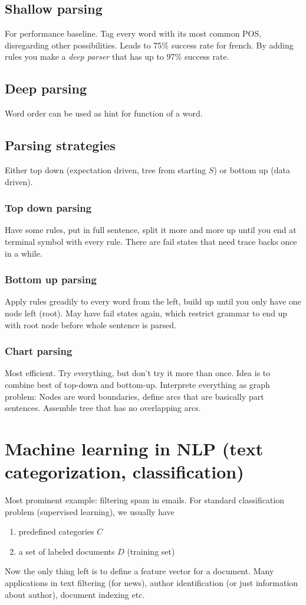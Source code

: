 \documentclass[11pt]{article}
\begin{document}
\subsection{Shallow parsing}
For performance baseline. Tag every word with its most common POS, disregarding other
possibilities. Leads to 75\% success rate for french. By adding rules you make
a \emph{deep parser} that has up to 97\% success rate.

\subsection{Deep parsing}
Word order can be used as hint for function of a word.

\subsection{Parsing strategies}
Either top down (expectation driven, tree from starting $S$) or bottom up (data driven).

\subsubsection{Top down parsing}
Have some rules, put in full sentence, split it more and more up until you end at
terminal symbol with every rule. There are fail states that need trace backs once in a while.

\subsubsection{Bottom up parsing}
Apply rules greadily to every word from the left, build up until you only have one node
left (root). May have fail states again, which restrict grammar to end up with root
node before whole sentence is parsed.

\subsubsection{Chart parsing}
Most efficient. Try everything, but don't try it more than once. Idea is to combine best 
of top-down and bottom-up. Interprete everything as graph problem: Nodes are word boundaries,
define arcs that are basically part sentences. Assemble tree that has no overlapping
arcs.

\section{Machine learning in NLP (text categorization, classification)}
Most prominent example: filtering spam in emails. For standard classification problem
(supervised learning), we usually have
\begin{enumerate}
	\item predefined categories $C$
	\item a set of labeled documents $D$ (training set)
\end{enumerate}
Now the only thing left is to define a feature vector for a document. Many applications 
in text filtering (for news), author identification (or just information about author),
document indexing etc.
\end{document}
